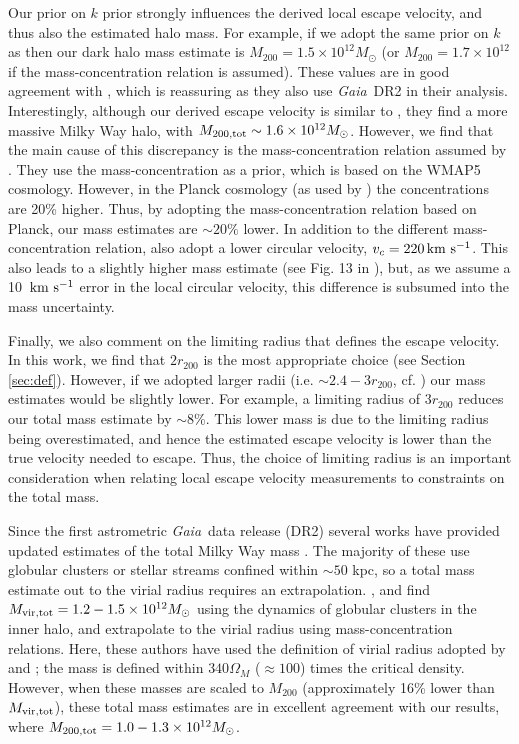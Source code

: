 \documentclass[fleqn,usenatbib]{mnras}
\newcommand{\kms}        {\,{\rm km}\,\,{\rm s}^{-1}}
\newcommand{\gaia}		{\emph{Gaia}}
\begin{document}
Our prior on $k$ prior strongly influences the derived local escape velocity, and thus also the estimated halo mass. For example, if we adopt the same prior on $k$ as \cite{monari18} then our dark halo mass estimate is $M_{200} = 1.5 \times 10^{12}M_\odot$ (or $M_{200} = 1.7 \times 10^{12}$ if the \citealt{dutton14} mass-concentration relation is assumed). These values are in good agreement with \cite{monari18}, which is reassuring as they also use \gaia\ DR2 in their analysis. Interestingly, although our derived escape velocity is similar to \cite{piffl14}, they find a more massive Milky Way halo, with $M_{200, \rm tot} \sim 1.6 \times 10^{12}M_\odot$. However, we find that the main cause of this discrepancy is the mass-concentration relation assumed by \cite{piffl14}. They use the \cite{maccio08} mass-concentration as a prior, which is based on the WMAP5 cosmology. However, in the Planck cosmology (as used by \citealt{dutton14}) the concentrations are 20\% higher. Thus, by adopting the \cite{dutton14} mass-concentration relation based on Planck, our mass estimates are $\sim 20\%$ lower. In addition to the different mass-concentration relation, \cite{piffl14} also adopt a lower circular velocity, $v_c = 220 \kms$. This also leads to a slightly higher mass estimate (see Fig. 13 in \citealt{piffl14}), but, as we assume a 10 $\kms$ error in the local circular velocity, this difference is subsumed into the mass uncertainty.

Finally, we also comment on the limiting radius that defines the escape velocity. In this work, we find that $2r_{200}$ is the most appropriate choice (see Section \ref{sec:def}). However, if we adopted larger radii (i.e. $\sim 2.4-3 r_{200}$, cf. \citealt{smith07, piffl14}) our mass estimates would be slightly lower. For example, a limiting radius of $3r_{200}$ reduces our total mass estimate by $\sim 8$\%. This lower mass is due to the limiting radius being overestimated, and hence the estimated escape velocity is lower than the true velocity needed to escape. Thus, the choice of limiting radius is an important consideration when relating local escape velocity measurements to constraints on the total mass.

Since the first astrometric \gaia\ data release (DR2) several works have provided updated estimates of the total Milky Way mass \cite[e.g.][]{eadie18, malhan18, watkins18, callingham19, posti19, vasiliev19}. The majority of these use globular clusters or stellar streams confined within $\sim 50$ kpc, so a total mass estimate out to the virial radius requires an extrapolation. \cite{watkins18}, \cite{posti19} and \cite{vasiliev19} find $M_{\rm vir, tot} =1.2-1.5 \times 10^{12}M_\odot$ using the dynamics of globular clusters in the inner halo, and extrapolate to the virial radius using mass-concentration relations. Here, these authors have used the definition of virial radius adopted by \cite{bryan98} and \cite{klypin02}; the mass is defined within $340 \Omega_M$ ($\approx 100$) times the critical density. However, when these masses are scaled to $M_{200}$ (approximately 16\% lower than $M_{\rm vir, tot}$), these total mass estimates are in excellent agreement with our results, where $M_{200, \rm tot} = 1.0-1.3 \times 10^{12}M_\odot$.
  
\end{document}
